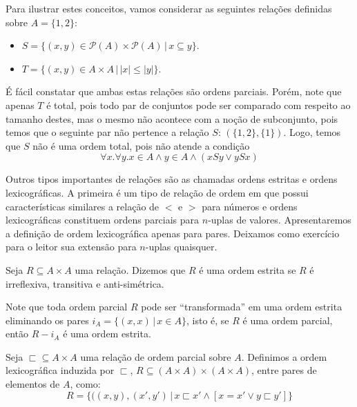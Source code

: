\begin{Example}
Para ilustrar estes conceitos, vamos considerar as seguintes relações
definidas sobre $A = \{1,2\}$:
\begin{itemize}
  \item $S = \{(x,y)\in\mathcal{P}(A)\times\mathcal{P}(A)\,|\,x
    \subseteq y\}$.
  \item $T = \{(x,y)\in A \times A\,|\,|x| \leq |y|\}$.
\end{itemize}
É fácil constatar que ambas estas relações são ordens parciais. Porém,
note que apenas $T$ é total, pois todo par de conjuntos pode ser
comparado com respeito ao tamanho destes, mas o mesmo não acontece com
a noção de subconjunto, pois temos que o seguinte par não pertence a
relação $S$: $(\{1,2\},\{1\})$. Logo, temos que $S$ não é uma ordem
total, pois não atende a condição
\[
\forall x. \forall y. x\in A \land y \in A \land (xSy \lor ySx)
\]
\end{Example}

Outros tipos importantes de relações são as chamadas ordens estritas
e ordens lexicográficas. A primeira é um tipo de relação de ordem em
que possui características similares a relação de $<$ e $>$ para
números e ordens lexicográficas constituem ordens parciais para
$n$-uplas de valores. Apresentaremos a definição de ordem
lexicográfica apenas para pares. Deixamos como exercício para o leitor
sua extensão para $n$-uplas quaisquer.

\begin{Definition}
Seja $R \subseteq A \times A$ uma relação. Dizemos que $R$ é uma ordem
estrita se $R$ é irreflexiva, transitiva e anti-simétrica.
\end{Definition}

Note que toda ordem parcial $R$ pode ser ``transformada'' em uma ordem
estrita eliminando os pares $i_{A}=\{(x,x)\,|\,x\in A\}$, isto é, se
$R$ é uma ordem parcial, então $R - i_A$ é uma ordem estrita.

\begin{Definition}\label{lexorder}
Seja $\sqsubset \subseteq A \times A$ uma relação de ordem parcial
sobre $A$. Definimos a ordem lexicográfica induzida por $\sqsubset$,
$R \subseteq (A \times A) \times (A \times A)$, entre pares de
elementos de $A$, como:
\[
R = \{((x,y),(x',y')\,|\,x\sqsubset x' \land [x = x' \lor y \sqsubset y']\}
\]
\end{Definition}


